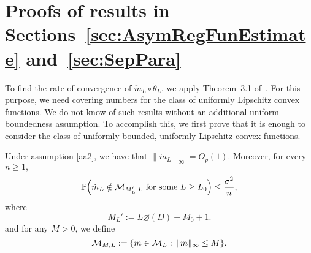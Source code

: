 \section{Proofs of results in Sections~\ref{sec:AsymRegFunEstimate} and~\ref{sec:SepPara}} %
\label{app:AsymCLSE_Proof}
To  find the rate of convergence of $\check{m}_{{L}}\circ\check{\theta}_{{L}}$, we apply Theorem~3.1 of~\cite{KuchiPatra19}. For this purpose, we need covering numbers for the class of uniformly Lipschitz convex functions. We do not know of such results without an additional uniform boundedness assumption. To accomplish this, we first prove that it is enough to consider the class of uniformly bounded, uniformly Lipschitz convex functions.
\begin{lemma}\label{lem:Upsilion_ep}
Under assumption \ref{aa2}, we have that $\|\check{m}_{{L}}\|_\infty=O_p(1).$
Moreover, for every $n \ge 1,$
\begin{equation}\label{eq:bound_m_check}
\mathbb{P}\Big(\check{m}_{{L}} \notin \mathcal{M}_{M_L', L}\mbox{ for some }L \ge L_0\Big) \le \frac{\sigma^2}{n},
\end{equation}
where
\begin{equation}\label{eq:M_ep}
M_L' :=L\diameter(D) + M_0 + 1.
\end{equation} and for any $M>0$, we define
\begin{equation}\label{eq:bounded_M}
\mathcal{M}_{M,L} := \{m \in \mathcal{M}_L :\, \|m\|_{\infty}\le M\}.
\end{equation}
\end{lemma}
